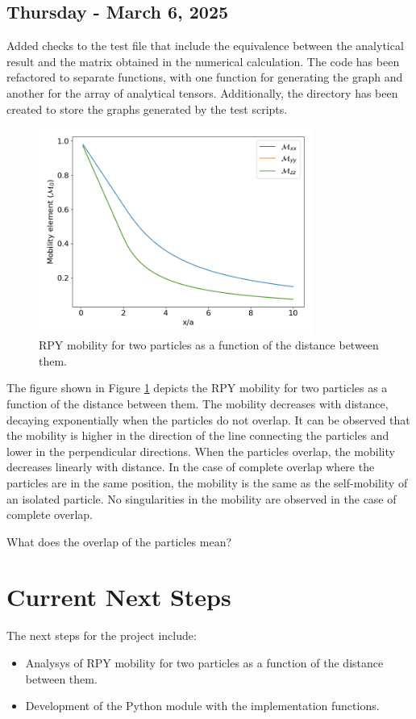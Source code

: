 \documentclass[12pt]{article} %
\begin{document}
\subsection{Thursday - March 6, 2025}
Added checks to the test file  that
include the equivalence between the analytical result and the matrix
obtained in the numerical calculation. The code has been refactored
to separate functions, with one function for generating the graph and
another for the array of analytical tensors. Additionally, the
 directory has been created to store the graphs generated
by the test scripts.
\begin{figure}[h]
    \centering
    \includegraphics[width=0.8\textwidth]{figures/RPY_mobility_tensor_distance_dependence_.png}
    \caption{RPY mobility for two particles as a function of the distance between them.}
    \label{fig:RPY_mobility_tensor_distance_dependence}
\end{figure}
The figure shown in Figure \ref{fig:RPY_mobility_tensor_distance_dependence}
depicts the RPY mobility for two particles as a function of the distance
between them. The mobility decreases with distance, decaying exponentially
when the particles do not overlap. It can be observed that the mobility is
higher in the direction of the line connecting the particles and lower in
the perpendicular directions. When the particles overlap, the mobility
decreases linearly with distance. In the case of complete overlap where
the particles are in the same position, the mobility is the same as the
self-mobility of an isolated particle. No singularities in the mobility
are observed in the case of complete overlap.

\begin{tcolorbox}[colback=blue!5!white, colframe=blue!20!black, title=Doubt, colbacktitle=blue!20!white, coltitle=black]
    What does the overlap of the particles mean?
\end{tcolorbox}

\section{Current Next Steps}
The next steps for the project include:
\begin{itemize} 
    \item Analysys of RPY mobility for two particles as a function of the distance between them.
    \item Development of the Python module with the implementation functions.
\end{itemize}
\end{document}
